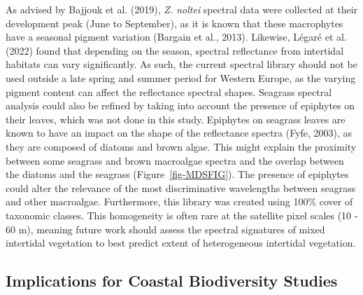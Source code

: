 \documentclass[
  letterpaper,
  11pt,
  english,
  singlespacing,
  headsepline]{MastersDoctoralThesis}
\begin{document}
\begin{spacing}{1.5}
As advised by Bajjouk et al. (2019), \emph{Z. noltei} spectral data were
collected at their development peak (June to September), as it is known
that these macrophytes have a seasonal pigment variation (Bargain et
al., 2013). Likewise, Légaré et al. (2022) found that depending on the
season, spectral reflectance from intertidal habitats can vary
significantly. As such, the current spectral library should not be used
outside a late spring and summer period for Western Europe, as the
varying pigment content can affect the reflectance spectral shapes.
Seagrass spectral analysis could also be refined by taking into account
the presence of epiphytes on their leaves, which was not done in this
study. Epiphytes on seagrass leaves are known to have an impact on the
shape of the reflectance spectra (Fyfe, 2003), as they are composed of
diatoms and brown algae. This might explain the proximity between some
seagrass and brown macroalgae spectra and the overlap between the
diatoms and the seagrass (Figure~\ref{fig-MDSFIG}). The presence of
epiphytes could alter the relevance of the most discriminative
wavelengths between seagrass and other macroalgae. Furthermore, this
library was created using 100\% cover of taxonomic classes. This
homogeneity is often rare at the satellite pixel scales (10 - 60 m),
meaning future work should assess the spectral signatures of mixed
intertidal vegetation to best predict extent of heterogeneous intertidal
vegetation.

\subsection{Implications for Coastal Biodiversity
Studies}\label{implications-for-coastal-biodiversity-studies}


\end{spacing}
\end{document}
